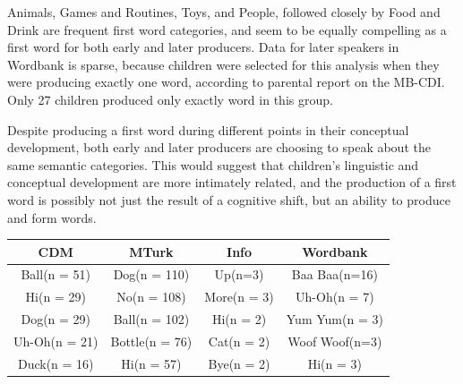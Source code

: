 \documentclass[10pt,letterpaper]{article}
\begin{document}
Animals, Games and Routines, Toys, and People, followed closely by Food and Drink are frequent first word categories, and seem to be equally compelling as a first word for both early and later producers. Data for later speakers in Wordbank is sparse, because children were selected for this analysis when they were producing exactly one word, according to parental report on the MB-CDI. Only 27 children produced only exactly word in this group.

Despite producing a first word during different points in their conceptual development, both early and later producers are choosing to speak about the same semantic categories. This would suggest that children's linguistic and conceptual development are more intimately related, and the production of a first word is possibly not just the result of a cognitive shift, but an ability to produce and form words.




{\centering
\begin{tabular}{ | c | c | c | c | }
 \hline
    CDM & MTurk & Info & Wordbank \\ \hline
    Ball\newline(n = 51) & Dog\newline(n = 110) & Up\newline(n=3) & Baa Baa\newline(n=16) \\ \hline
    Hi\newline(n = 29) & No\newline(n = 108) & More\newline(n = 3) & Uh-Oh\newline(n = 7) \\ \hline
    Dog\newline(n = 29) & Ball\newline(n = 102) & Hi\newline(n = 2) & Yum Yum\newline(n = 3) \\ \hline
    Uh-Oh\newline(n = 21) & Bottle\newline(n = 76) & Cat\newline(n = 2) & Woof Woof\newline(n=3) \\ \hline
    Duck\newline(n = 16) & Hi\newline(n = 57) & Bye\newline(n = 2) & Hi\newline(n = 3) \\ \hline		
 \end{tabular}
}
\end{document}
